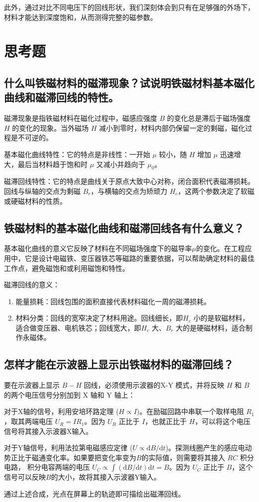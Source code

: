 \documentclass{../../templates/Report}%
\begin{document}
\begin{fullreportonly}
    此外，通过对比不同电压下的回线形状，我们深刻体会到只有在足够强的外场下，材料才能达到深度饱和，从而测得完整的磁参数。

    \section{思考题}

    \subsection{什么叫铁磁材料的磁滞现象？试说明铁磁材料基本磁化曲线和磁滞回线的特性。}
    磁滞现象是指铁磁材料在磁化过程中，磁感应强度 $B$ 的变化总是滞后于磁场强度 $H$ 的变化的现象。当外磁场 $H$ 减小到零时，材料内部仍保留一定的剩磁，磁化过程是不可逆的。

    基本磁化曲线特性：它的特点是非线性：一开始 $\mu$ 较小，随 $H$ 增加 $\mu$ 迅速增大，最后当材料趋于饱和时 $\mu$ 又减小并趋向于 $\mu_0$。

    磁滞回线特性：它的特点是曲线关于原点大致中心对称，闭合面积代表磁滞损耗。回线与纵轴的交点为剩磁 $B_r$，与横轴的交点为矫顽力 $H_c$，这两个参数决定了软磁或硬磁材料的性质。

    \subsection{铁磁材料的基本磁化曲线和磁滞回线各有什么意义？}
    基本磁化曲线的意义它反映了材料在不同磁场强度下的磁导率$\mu$的变化。在工程应用中，它是设计电磁铁、变压器铁芯等磁路的重要依据，可以帮助确定材料的最佳工作点，避免磁饱和或利用磁饱和特性。

    磁滞回线的意义：
    \begin{enumerate}
        \item 能量损耗：回线包围的面积直接代表材料磁化一周的磁滞损耗。
        \item 材料分类：回线的宽窄决定了材料用途。回线细长，即$H_c$ 小的是软磁材料，适合做变压器、电机铁芯；回线宽大，即$H_c$ 大、$B_r$ 大的是硬磁材料，适合制作永磁体。
    \end{enumerate}

    \subsection{怎样才能在示波器上显示出铁磁材料的磁滞回线？}
    要在示波器上显示 $B-H$ 回线，必须使用示波器的X-Y 模式，并将反映 $H$ 和 $B$ 的两个电压信号分别加到 X 轴和 Y 轴上：

    对于X轴的信号，利用安培环路定理 ($H \propto I$)。在励磁回路中串联一个取样电阻 $R_1$，取其两端电压 $U_R = I R_1$。因为 $U_R$ 正比于 $I$，也就正比于 $H$，可以将这个电压信号将其接入示波器X输入。

    对于Y轴信号，利用法拉第电磁感应定律 ($U \propto \mathrm{d}B/\mathrm{d}t$)。探测线圈产生的感应电动势正比于磁通变化率。如果要把变化率变为$B$的实际值，则需要将其接入 $RC$ 积分电路，
    积分电容两端的电压 $U_C \propto \int (\mathrm{d}B/\mathrm{d}t) \mathrm{d}t = B$。因为 $U_C$ 正比于 $B$，这个信号可以反映$B$的大小，故将其接入示波器Y输入。

    通过上述合成，光点在屏幕上的轨迹即可描绘出磁滞回线。
\end{fullreportonly}
\insertnotes
\end{document}
